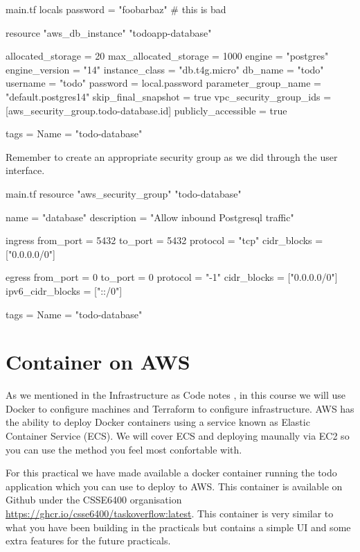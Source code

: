 \documentclass{csse4400}
\begin{document}
\begin{code}[language=terraform,numbers=none]{main.tf}
locals {
  password = "foobarbaz" # this is bad
}

resource "aws_db_instance" "todoapp-database" {
  allocated_storage      = 20
  max_allocated_storage  = 1000
  engine                 = "postgres"
  engine_version         = "14"
  instance_class         = "db.t4g.micro"
  db_name                = "todo"
  username               = "todo"
  password               = local.password
  parameter_group_name   = "default.postgres14"
  skip_final_snapshot    = true
  vpc_security_group_ids = [aws_security_group.todo-database.id]
  publicly_accessible    = true

  tags = {
    Name = "todo-database"
  }
}
\end{code}

\noindent Remember to create an appropriate security group as we did through the user interface.

\begin{code}[language=terraform,numbers=none]{main.tf}
resource "aws_security_group" "todo-database" {
  name        = "database"
  description = "Allow inbound Postgresql traffic"

  ingress {
    from_port        = 5432
    to_port          = 5432
    protocol         = "tcp"
    cidr_blocks      = ["0.0.0.0/0"]
  }

  egress {
    from_port        = 0
    to_port          = 0
    protocol         = "-1"
    cidr_blocks      = ["0.0.0.0/0"]
    ipv6_cidr_blocks = ["::/0"]
  }

  tags = {
    Name = "todo-database"
  }
}
\end{code}


\section{Container on AWS}

As we mentioned in the Infrastructure as Code notes \cite{iac-notes},
in this course we will use Docker to configure machines and Terraform to configure infrastructure.
AWS has the ability to deploy Docker containers using a service known as Elastic Container Service (ECS). We will cover ECS and deploying maunally via EC2 so you can use the method you feel most confortable with.

For this practical we have made available a docker container running the todo application which you can use to deploy to AWS. This container is available on Github under the CSSE6400 organisation \url{https://ghcr.io/csse6400/taskoverflow:latest}. This container is very similar to what you have been building in the practicals but contains a simple UI and some extra features for the future practicals.
\end{document}
